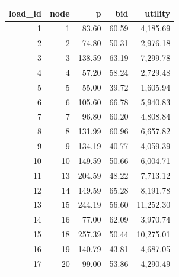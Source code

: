 \begin{tabular}{rrrrr}
\toprule
load\_id & node & p & bid & utility \\
\midrule
1 & 1 & 83.60 & 60.59 & 4,185.69 \\
2 & 2 & 74.80 & 50.31 & 2,976.18 \\
3 & 3 & 138.59 & 63.19 & 7,299.78 \\
4 & 4 & 57.20 & 58.24 & 2,729.48 \\
5 & 5 & 55.00 & 39.72 & 1,605.94 \\
6 & 6 & 105.60 & 66.78 & 5,940.83 \\
7 & 7 & 96.80 & 60.20 & 4,808.84 \\
8 & 8 & 131.99 & 60.96 & 6,657.82 \\
9 & 9 & 134.19 & 40.77 & 4,059.39 \\
10 & 10 & 149.59 & 50.66 & 6,004.71 \\
11 & 13 & 204.59 & 48.22 & 7,713.12 \\
12 & 14 & 149.59 & 65.28 & 8,191.78 \\
13 & 15 & 244.19 & 56.60 & 11,252.30 \\
14 & 16 & 77.00 & 62.09 & 3,970.74 \\
15 & 18 & 257.39 & 50.44 & 10,275.01 \\
16 & 19 & 140.79 & 43.81 & 4,687.05 \\
17 & 20 & 99.00 & 53.86 & 4,290.49 \\
\bottomrule
\end{tabular}
